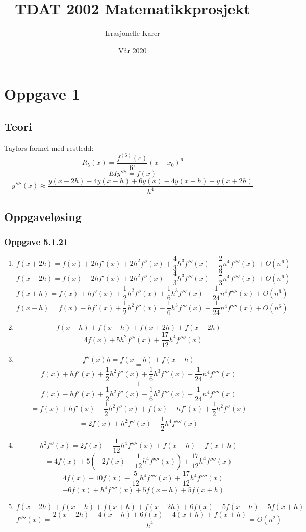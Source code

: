 \documentclass{article}
\title{TDAT 2002 Matematikkprosjekt}
\author{Irrasjonelle Karer}
\date{Vår 2020}
\begin{document}
        \maketitle
        \newpage
        \tableofcontents
        \newpage
        
        \section{Oppgave 1}
        \subsection{Teori}
        Taylors formel med restledd:
        \[R_5(x)= \frac{f^{(6)}(c)} {6!}(x-x_0)^6\]
        \[EIy''''=f(x)\]
        \[y''''(x) \approx \frac{y(x - 2h)-4y(x - h)+ 6y(x) - 4y(x + h) + y(x + 2h)}{h^4}\]
        \subsection{Oppgaveløsing}
    
    \subsubsection{Oppgave 5.1.21}
    \begin{enumerate}

        \item \[f(x + 2h) = f(x) + 2hf'(x) + 2h^2f''(x) + \frac{4}{3}h^3f'''(x)+ \frac{2}{3}n^4f''''(x) +O(n^6)\]
         \[f(x - 2h) = f(x) - 2hf'(x) + 2h^2f''(x) - \frac{4}{3}h^3f'''(x)+ \frac{2}{3}n^4f''''(x) +O(n^6)\]
         \[f(x + h) = f(x) + hf'(x) + \frac{1}{2}h^2f''(x) + \frac{1}{6}h^3f'''(x)+ \frac{1}{24}n^4f''''(x) +O(n^6)\]
         \[f(x - h) = f(x) - hf'(x) + \frac{1}{2}h^2f''(x) - \frac{1}{6}h^3f'''(x)+ \frac{1}{24}n^4f''''(x) +O(n^6)\]
        \item \[f(x + h) + f(x - h) + f(x + 2h) + f(x - 2h)\]
        \[= 4f(x) + 5h^2f'''(x) + \frac{17}{12}h^4f''''(x)\]
        \item \[f''(x)h = f(x - h) + f(x + h)\]
        \[=\]
        \[f(x) + hf'(x) + \frac{1}{2}h^2f''(x) + \frac{1}{6}h^3f'''(x)+ \frac{1}{24}n^4f''''(x)\]
        \[+\]
        \[f(x) - hf'(x) + \frac{1}{2}h^2f''(x) - \frac{1}{6}h^3f'''(x)+ \frac{1}{24}n^4f''''(x)\]
        \[= f(x) + hf'(x) + \frac{1}{2}h^2f''(x) + f(x) - hf'(x) + \frac{1}{2}h^2f''(x)\]
        \[= 2f(x) + h^2f''(x) + \frac{1}{2}h^4f''''(x)\]
        \item
        \[h^2f''(x) = 2f(x) - \frac{1}{12}h^4f''''(x) + f(x - h) + f(x + h)\]
        \[= 4f(x) + 5(-2f(x)-\frac{1}{12} h^4f''''(x)) + \frac{17}{12}h^4f''''(x)\]
        \[= 4f(x) - 10f(x) - \frac{5}{12}h^4f''''(x) + \frac{17}{12}h^4f''''(x)\]
        \[= -6f(x) + h^4f''''(x) + 5f(x - h) + 5f(x + h)\]
        \item \[f(x - 2h) + f(x - h) + f(x + h) + f(x + 2h) + 6f(x) - 5f(x - h) - 5f(x + h)\]
        \[f''''(x) = \frac{2(x-2h) - 4(x-h) + 6f(x) - 4(x+h) + f(x+h)} {h^4} = O(n^2)\]
    \end{enumerate}
\end{document}
